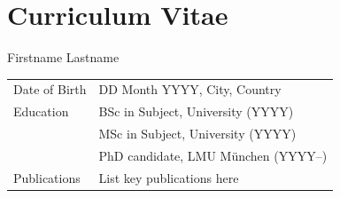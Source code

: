 \chapter*{Curriculum Vitae}

Firstname Lastname

\vspace*{2.0cm}

\begin{tabular}{ll}
Date of Birth    & DD Month YYYY, City, Country       \\[1.5ex]
Education        & BSc in Subject, University (YYYY)  \\[1.5ex]
                 & MSc in Subject, University (YYYY)  \\[1.5ex]
                 & PhD candidate, LMU München (YYYY--) \\[1.5ex]
Publications     & List key publications here         \\[1.5ex]
\end{tabular}
